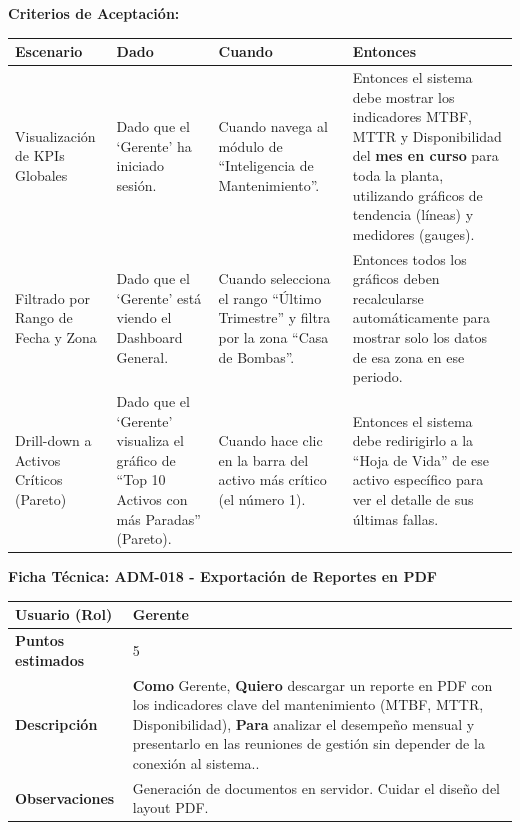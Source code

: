 \noindent
\textbf{Criterios de Aceptación:}
\footnotesize
\begin{longtable}{|p{}|p{}|p{}|p{}|}
\hline
\textbf{Escenario} & \textbf{Dado} & \textbf{Cuando} & \textbf{Entonces} \\ \hline
\endhead
Visualización de KPIs Globales & Dado que el `Gerente' ha iniciado sesión. & Cuando navega al módulo de ``Inteligencia de Mantenimiento''. & Entonces el sistema debe mostrar los indicadores MTBF, MTTR y Disponibilidad del \textbf{mes en curso} para toda la planta, utilizando gráficos de tendencia (líneas) y medidores (gauges). \\ \hline
Filtrado por Rango de Fecha y Zona & Dado que el `Gerente' está viendo el Dashboard General. & Cuando selecciona el rango ``Último Trimestre'' y filtra por la zona ``Casa de Bombas''. & Entonces todos los gráficos deben recalcularse automáticamente para mostrar solo los datos de esa zona en ese periodo. \\ \hline
Drill-down a Activos Críticos (Pareto) & Dado que el `Gerente' visualiza el gráfico de ``Top 10 Activos con más Paradas'' (Pareto). & Cuando hace clic en la barra del activo más crítico (el número 1). & Entonces el sistema debe redirigirlo a la ``Hoja de Vida'' de ese activo específico para ver el detalle de sus últimas fallas. \\ \hline
\end{longtable}
\normalsize

\noindent
\textbf{Ficha Técnica: ADM-018 - Exportación de Reportes en PDF}
\footnotesize
\begin{longtable}{|p{}|p{}|}
\hline
\textbf{Usuario (Rol)} & Gerente \\ \hline
\textbf{Puntos estimados} & 5 \\ \hline
\textbf{Descripción} & \textbf{Como} Gerente, \textbf{Quiero} descargar un reporte en PDF con los indicadores clave del mantenimiento (MTBF, MTTR, Disponibilidad), \textbf{Para} analizar el desempeño mensual y presentarlo en las reuniones de gestión sin depender de la conexión al sistema.. \\ \hline
\textbf{Observaciones} & Generación de documentos en servidor. Cuidar el diseño del layout PDF. \\ \hline
\end{longtable}
\normalsize

